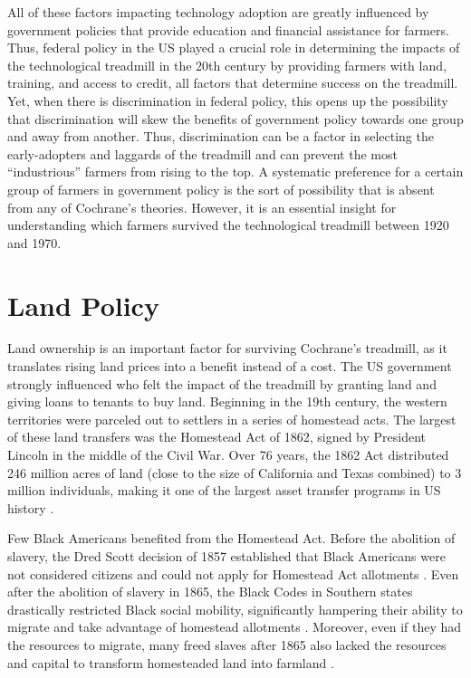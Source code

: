 \documentclass[12pt]{article}
\begin{document}
All of these factors impacting technology adoption are greatly influenced by government policies that provide education and financial assistance for farmers.
Thus, federal policy in the US played a crucial role in determining the impacts of the technological treadmill in the 20th century by providing farmers with land, training, and access to credit, all factors that determine success on the treadmill.
Yet, when there is discrimination in federal policy, this opens up the possibility that discrimination will skew the benefits of government policy towards one group and away from another.
Thus, discrimination can be a factor in selecting the early-adopters and laggards of the treadmill and can prevent the most ``industrious'' farmers from rising to the top.
A systematic preference for a certain group of farmers in government policy is the sort of possibility that is absent from any of Cochrane's theories.
However, it is an essential insight for understanding which farmers survived the technological treadmill between 1920 and 1970.




\section*{Land Policy}
Land ownership is an important factor for surviving Cochrane's treadmill, as it translates rising land prices into a benefit instead of a cost.
The US government strongly influenced who felt the impact of the treadmill by granting land and giving loans to tenants to buy land.
Beginning in the 19th century, the western territories were parceled out to settlers in a series of homestead acts. 
The largest of these land transfers was the Homestead Act of 1862, signed by President Lincoln in the middle of the Civil War. 
Over 76 years, the 1862 Act distributed 246 million acres of land (close to the size of California and Texas combined) to 3 million individuals, making it one of the largest asset transfer programs in US history \citep{williams_shanks_homestead_2000}. 

Few Black Americans benefited from the Homestead Act. 
Before the abolition of slavery, the Dred Scott decision of 1857 established that Black Americans were not considered citizens and could not apply for Homestead Act allotments \citep{muhammad_african_2024}. 
Even after the abolition of slavery in 1865, the Black Codes in Southern states drastically restricted Black social mobility, significantly hampering their ability to migrate and take advantage of homestead allotments \citep{meredith_black_1940}.  
Moreover, even if they had the resources to migrate, many freed slaves after 1865 also lacked the resources and capital to transform homesteaded land into farmland \citep{edwards_african_2019,muhammad_african_2024}. 
\end{document}
